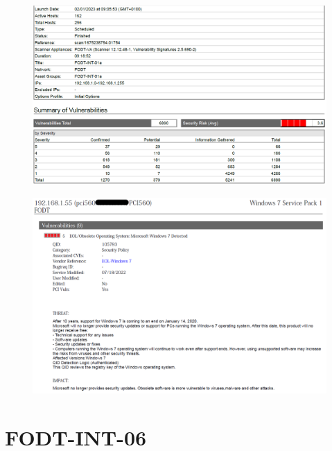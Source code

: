 \documentclass[target=bach,aauheader=]{thud}
\begin{document}
\begin{figure}[h]
    \centering
    \includegraphics[width=1\linewidth]{images/FODT-INT-01a_1.png}
    \caption{}
    \label{fig:fodt-int-01a_1}
\end{figure}

\pagebreak

\begin{figure}[h]
    \centering
    \includegraphics[width=1\linewidth]{images/FODT-INT-01a_2.png}
    \caption{}
    \label{fig:fodt-int-01a_2}
\end{figure}

\pagebreak

\section{FODT-INT-06}
\end{document}
